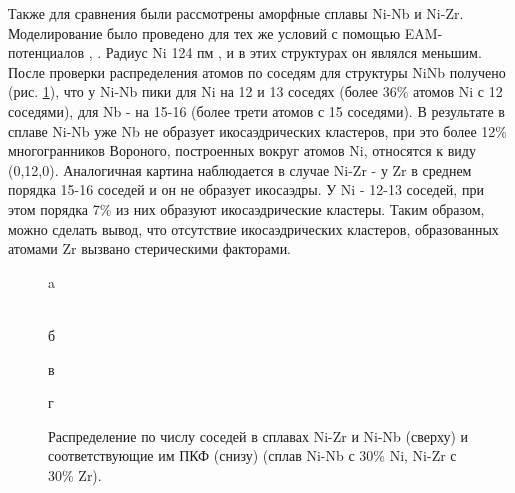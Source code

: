 Также для сравнения были рассмотрены аморфные сплавы Ni-Nb и Ni-Zr. Моделирование было проведено для тех же условий с помощью EAM-потенциалов  \cite{Zhang}, \cite{Mendelev}. Радиус Ni 124 пм \cite{Tretyakov}, и в этих структурах он являлся меньшим. После проверки распределения атомов по соседям для структуры NiNb  получено (рис. \ref{Ni}), что  у Ni-Nb пики для Ni на 12 и 13 соседях (более 36\% атомов Ni с 12 соседями), для Nb - на 15-16 (более трети атомов с 15 соседями). В результате в сплаве Ni-Nb  уже Nb не образует икосаэдрических кластеров, при это более 12\% многогранников Вороного, построенных вокруг атомов Ni, относятся к виду (0,12,0). Аналогичная картина наблюдается в случае  Ni-Zr  - у Zr в среднем порядка 15-16 соседей и он не образует икосаэдры. У Ni - 12-13 соседей, при этом порядка 7\% из них образуют икосаэдрические кластеры. Таким образом, можно сделать вывод, что отсутствие икосаэдрических кластеров, образованных атомами Zr вызвано стерическими факторами.
\begin{figure}[h!]
	\begin{minipage}[h]{0.5\linewidth}
		 a \\
	\end{minipage}
	\hfill
	\begin{minipage}[h]{0.5\linewidth}
		 \\б
	\end{minipage}
	\vfill
	\begin{minipage}[h]{0.5\linewidth}
		 в \\
	\end{minipage}
	\hfill
	\begin{minipage}[h]{0.5\linewidth}
		 г \\
	\end{minipage}
	\caption{Распределение по числу соседей в сплавах Ni-Zr и Ni-Nb (сверху) и соответствующие им ПКФ (снизу) (сплав Ni-Nb с 30\% Ni, Ni-Zr с 30\% Zr).}
	\label{Ni}
\end{figure}

